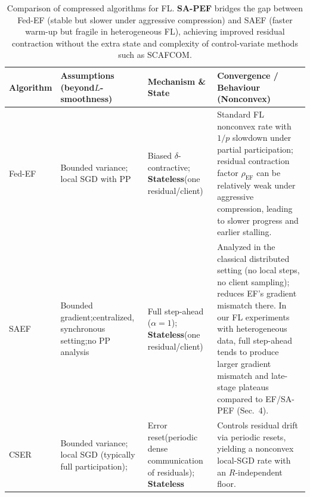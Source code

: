 \documentclass{article} %
\begin{document}
\begin{table}[t]
\centering
\scriptsize
\caption{Comparison of compressed algorithms for FL. \textbf{SA-PEF} bridges the gap between Fed-EF (stable but slower under aggressive compression) and SAEF (faster warm-up but fragile in heterogeneous FL), achieving improved residual contraction without the extra state and complexity of control-variate methods such as SCAFCOM.}
\setlength{\tabcolsep}{3pt}
\begin{tabular}{p{1.2cm} p{2.1cm} p{2.6cm} p{7.22cm}}
\toprule
\textbf{Algorithm}
& \textbf{Assumptions \newline(beyond\newline $L$-smoothness)}
& \textbf{Mechanism \& State}
& \textbf{Convergence / Behaviour (Nonconvex)} \\
\midrule
Fed-EF\newline \citep{li2023analysis}
& Bounded variance; local SGD with PP
& Biased $\delta$-contractive; \newline \textbf{Stateless}\newline (one residual/client)
& Standard FL nonconvex rate with $1/p$ slowdown under partial participation; 
residual contraction factor $\rho_{\text{EF}}$ can be relatively weak under aggressive compression, leading to slower progress and earlier stalling. \\
[0.4em]
SAEF\newline \citep{xu2021step}
& Bounded gradient;\newline centralized, synchronous setting;\newline no PP analysis
& Full step-ahead ($\alpha=1$); \newline \textbf{Stateless}\newline (one residual/client)
& Analyzed in the classical distributed setting (no local steps, no client sampling); reduces EF’s gradient mismatch there. \newline
In our FL experiments with heterogeneous data, full step-ahead tends to produce larger gradient mismatch and late-stage plateaus compared to EF/SA-PEF (Sec.~4). \\
[0.4em]
CSER\newline \citep{xie2020cser}
& Bounded variance; local SGD (typically full participation);
& Error reset\newline (periodic dense communication of residuals); \newline \textbf{Stateless}
& Controls residual drift via periodic resets, yielding a nonconvex local-SGD rate with an $R$-independent floor. \newline

\end{tabular}
\end{table}
\end{document}
